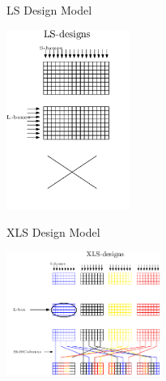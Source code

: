 \begin{frame}{LS Design Model}


    
\begin{center}
    \includegraphics[width=4cm]{ls.png}
\end{center}

\end{frame}

\begin{frame}{XLS Design Model}
\begin{center}
    \includegraphics[width=5cm]{xls.png}
\end{center}
\end{frame}
